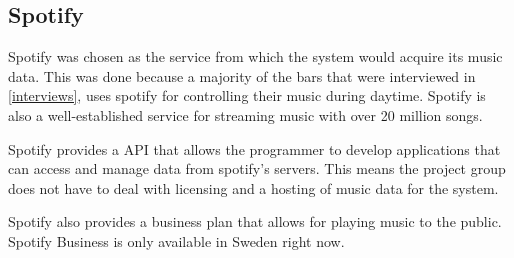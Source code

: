 \subsection{Spotify}
\label{sub:spotify}
Spotify was chosen as the service from which the system would acquire its music data. This was done because a majority of the bars that were interviewed in \cref{interviews}, uses spotify for controlling their music during daytime. Spotify is also a well-established service for streaming music with over 20 million songs.

Spotify provides a API that allows the programmer to develop applications that can access and manage data from spotify’s servers. This means the project group does not have to deal with licensing and a hosting of music data for the system.

Spotify also provides a business plan that allows for playing music to the public. Spotify Business is only available in Sweden right now.

